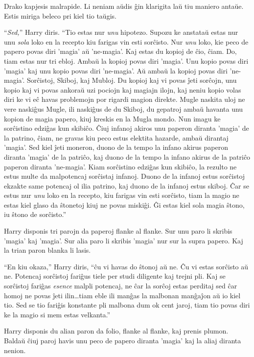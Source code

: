 Drako kapjesis malrapide. Li neniam aŭdis ĝin klarigita laŭ tiu
maniero antaŭe. Estis miriga beleco pri kiel tio taŭgis.

``\emph{Sed,}'' Harry diris. ``Tio estas nur \emph{unu}
hipotezo. Supozu ke anstataŭ estas nur unu \emph{sola} loko en la
recepto kiu farigas vin esti sorĉisto. Nur \emph{unu} loko, kie peco
de papero povas diri 'magia' aŭ 'ne-magia'. Kaj estas du kopioj de
ĉio, ĉiam. Do, tiam estas nur tri ebloj. Ambaŭ la kopioj povas diri
'magia'. Unu kopio povas diri 'magia' kaj unu kopio povas diri
'ne-magia'.  Aŭ ambaŭ la kopioj povas diri 'ne-magia'. Sorĉistoj,
Skiboj, kaj Mubloj. Du kopioj kaj vi povas ĵeti sorĉojn, unu kopio kaj
vi povas ankoraŭ uzi pociojn kaj magiajn ilojn, kaj neniu kopio volas
diri ke vi eĉ havas problemojn por rigardi magion direkte. Mugle
naskita uloj ne vere naskiĝus Mugle, ili naskiĝus de du Skiboj, du
gepatroj ambaŭ havanta unu kopion de magia papero, kiuj kreskis en la
Mugla mondo. Nun imagu ke sorĉistino edziĝas kun skibiĉo. Ĉiuj infanoj
akiros unu paperon diranta 'magia' de la patrino, ĉiam, ne gravas kiu
peco estus elektita hazarde, ambaŭ dirantaj 'magia'. Sed kiel ĵeti
moneron, duono de la tempo la infano akirus paperon diranta 'magia' de
la patriĉo, kaj duono de la tempo la infano akirus de la patriĉo
paperon diranta 'ne-magia'. Kiam sorĉistino edziĝas kun skibiĉo, la
rezulto ne estus multe da malpotencaj sorĉistaj infanoj. Duono de la
infanoj estus sorĉistoj ekzakte same potencaj ol ilia patrino, kaj
duono de la infanoj estus skiboj. Ĉar se estus nur \emph{unu} loko en
la recepto, kiu farigas vin esti sorĉisto, tiam la magio ne estas kiel
glaso da ŝtonetoj kiuj ne povas miskiĝi. Ĝi estas kiel sola magia
ŝtono, iu ŝtono de sorĉisto.''

Harry disponis tri parojn da paperoj flanke al flanke. Sur unu paro li skribis 'magia' kaj 'magia'. Sur alia paro li skribis 'magia' nur sur la supra papero. Kaj la trian paron blanka li lasis.

``En kiu okaza,'' Harry diris, ``ĉu vi havas do ŝtonoj aŭ ne.  Ĉu vi
estas sorĉisto aŭ ne. Potencaj sorĉistoj fariĝus tiele per studi
diligente kaj trejni pli. Kaj se sorĉistoj fariĝas \emph{esence}
malpli potencaj, ne ĉar la sorĉoj estas perditaj sed ĉar homoj ne
povas ĵeti ilin\ldots{}tiam eble ili manĝas la malbonan manĝaĵon aŭ io
kiel tio. Sed se tio fariĝis konstante pli malbona dum ok cent jaroj,
tiam tio povas diri ke la magio si mem estas velkanta.''

Harry disponis du alian paron da folio, flanke al flanke, kaj prenis
plumon. Baldaŭ ĉiuj paroj havis unu peco de papero diranta 'magia' kaj
la aliaj diranta nenion.

